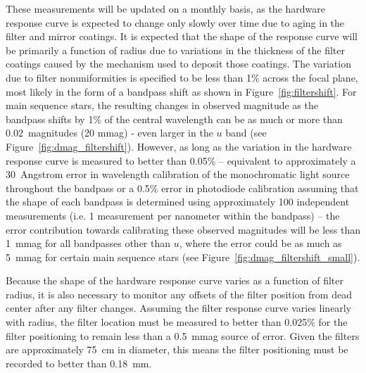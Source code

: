 \documentclass[12pt,preprint]{aastex}
\begin{document}
These measurements will be updated on a monthly basis, as the hardware
response curve is expected to change only slowly over time due to
aging in the filter and mirror coatings. It is expected that the shape
of the response curve will be primarily a function of radius due to
variations in the thickness of the filter coatings caused by the
mechanism used to deposit those coatings. The variation due to filter
nonuniformities is specified to be less than 1\% across the focal
plane, most likely in the form of a bandpass shift as shown in
Figure~\ref{fig:filtershift}. For main sequence stars, the resulting
changes in observed magnitude as the bandpass shifts by 1\% of the
central wavelength can be as much or more than 0.02~magnitudes (20
mmag) - even larger in the $u$ band (see
Figure~\ref{fig:dmag_filtershift}). However, as long as the variation
in the hardware response curve is measured to better than 0.05\% --
equivalent to approximately a 30~Angstrom error in wavelength
calibration of the monochromatic light source throughout the bandpass
or a 0.5\% error in photodiode calibration assuming that the shape of
each bandpass is determined using approximately 100 independent
measurements (i.e. 1 measurement per nanometer within the bandpass) --
the error contribution towards calibrating these observed magnitudes
will be less than 1~mmag for all bandpasses other than $u$, where the
error could be as much as 5~mmag for certain main sequence stars (see
Figure~\ref{fig:dmag_filtershift_small}).

Because the shape of the hardware response curve varies as a function
of filter radius, it is also necessary to monitor any offsets of the
filter position from dead center after any filter changes. Assuming
the filter response curve varies linearly with radius, the filter
location must be measured to better than 0.025\%  for the filter
positioning to remain less than a 0.5~mmag source of error. Given the
filters are approximately 75~cm in diameter, this means the filter 
positioning must be recorded to better than 0.18~mm. 
\end{document}
